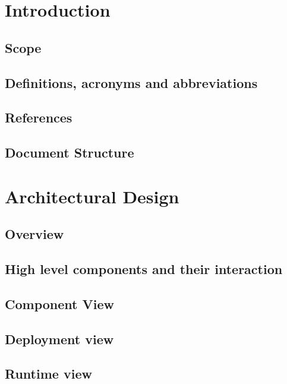 \documentclass{../Common/Structure/doc_pdf}
\begin{document}
\titleToc

\chapter{Introduction}

\section{Scope}

\section{Definitions, acronyms and abbreviations}

\section{References}

\section{Document Structure}

\newpage

\chapter{Architectural Design}
\section{Overview}

\section{High level components and their interaction}

\section{Component View}
\section{Deployment view}
\section{Runtime view}
\end{document}
